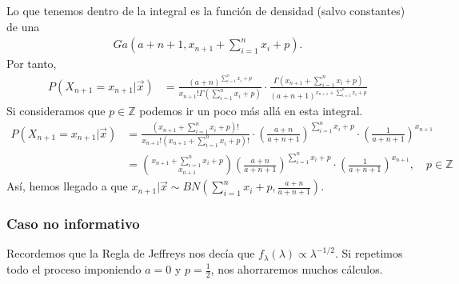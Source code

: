 Lo que tenemos dentro de la integral es la función de densidad (salvo constantes) de una
\begin{align*}
    Ga\left( a+n+1, x_{n+1} + \sum_{i=1}^{n} x_i + p \right).
\end{align*}
Por tanto,
\begin{align*}
    P(X_{n+1} = x_{n+1} | \vec{x}) & = \frac{(a+n)^{\sum_{i=1}^{n} x_i + p}}{x_{n+1}!\Gamma(\sum_{i=1}^{n} x_i + p)} \cdot \frac{\Gamma\left( x_{n+1} + \sum_{i=1}^{n} x_i + p\right)}{(a+n+1)^{x_{n+1} + \sum_{i=1}^{n} x_i + p}}
\end{align*}
Si consideramos que $p \in \mathbb{Z}$ podemos ir un poco más allá en esta integral.
\begin{align*}
    P(X_{n+1} = x_{n+1} | \vec{x}) & = \frac{\left( x_{n+1} + \sum_{i=1}^{n} x_i + p\right)!}{x_{n+1}!\left( x_{n+1} + \sum_{i=1}^{n} x_i + p \right)!} \cdot \left( \frac{a+n}{a+n+1}\right)^{\sum_{i=1}^{n} x_i + p} \cdot \left( \frac{1}{a+n+1}\right)^{x_{n+1}} \\
                                   & = \binom{x_{n+1} + \sum_{i=1}^{n} x_i + p}{x_{n+1}}\left( \frac{a+n}{a+n+1}\right)^{\sum_{i=1}^{n} x_i + p} \cdot \left( \frac{1}{a+n+1}\right)^{x_{n+1}}, \quad p \in \mathbb{Z}
\end{align*}
Así, hemos llegado a que $x_{n+1} | \vec{x} \sim BN\left( \sum_{i=1}^{n} x_i + p, \frac{a+n}{a+n+1} \right)$.
\subsubsection{Caso no informativo}
Recordemos que la Regla de Jeffreys nos decía que $f_{\lambda}(\lambda) \propto \lambda^{-1/2}$. Si repetimos todo el proceso imponiendo $a =0$ y $ p = \frac{1}{2}$, nos ahorraremos muchos cálculos.

